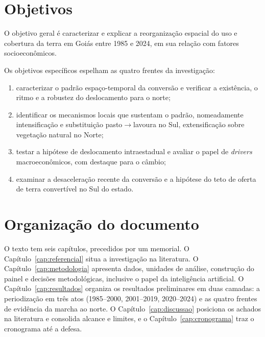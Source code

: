 \section{Objetivos}
\label{sec:intro-objetivos}

O objetivo geral é caracterizar e explicar a reorganização espacial do uso e
cobertura da terra em Goiás entre 1985 e 2024, em sua relação com fatores
socioeconômicos.

Os objetivos específicos espelham as quatro frentes da investigação:

\begin{enumerate}
  \item caracterizar o padrão espaço-temporal da conversão e verificar a
        existência, o ritmo e a robustez do deslocamento para o norte;
  \item identificar os mecanismos locais que sustentam o padrão,
        nomeadamente intensificação e substituição pasto$\to$lavoura no Sul,
        extensificação sobre vegetação natural no Norte;
  \item testar a hipótese de deslocamento intraestadual e avaliar o papel
        de \emph{drivers} macroeconômicos, com destaque para o câmbio;
  \item examinar a desaceleração recente da conversão e a hipótese do teto
        de oferta de terra convertível no Sul do estado.
\end{enumerate}

\section{Organização do documento}
\label{sec:intro-organizacao}

O texto tem seis capítulos, precedidos por um memorial. O
Capítulo~\ref{cap:referencial} situa a investigação na literatura. O
Capítulo~\ref{cap:metodologia} apresenta dados, unidades de análise,
construção do painel e decisões metodológicas, inclusive o papel da
inteligência artificial. O Capítulo~\ref{cap:resultados} organiza os
resultados preliminares em duas camadas: a periodização em três atos
(1985--2000, 2001--2019, 2020--2024) e as quatro frentes de evidência da
marcha ao norte. O Capítulo~\ref{cap:discussao} posiciona os achados na
literatura e consolida alcance e limites, e o
Capítulo~\ref{cap:cronograma} traz o cronograma até a defesa.
